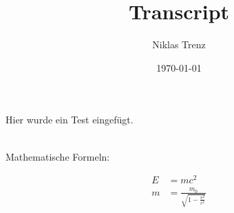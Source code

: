 \documentclass[a4paper,12pt]{article}
\title{Transcript}
\author{Niklas Trenz}
\date{\today}
\begin{document}
    \maketitle
    \tableofcontents

    Hier wurde ein Test eingefügt.

    
    \\
    Mathematische Formeln:

    \begin{align}
        E &= mc^2                   \\
        m &= \frac{m_0}{\sqrt{1-\frac{v^2}{c^2}}}
    \end{align}
\end{document}
